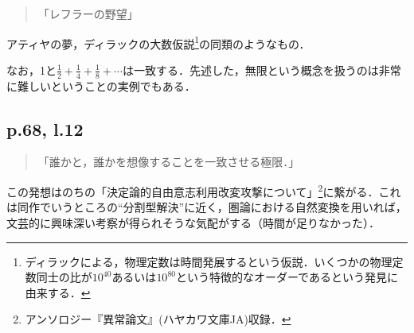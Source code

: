 \documentclass[10pt, a5paper, twoside]{jsarticle}
\theoremstyle{definition}
\begin{document}
                \begin{quote}

                    「レフラーの野望」

                \end{quote}

                アティヤの夢，ディラックの大数仮説\footnote{ディラックによる，物理定数は時間発展するという仮説．いくつかの物理定数同士の比が$10^{40}$あるいは$10^{80}$という特徴的なオーダーであるという発見に由来する．}の同類のようなもの．

                なお，1と$\displaystyle \frac{1}{2} + \frac{1}{4} + \frac{1}{8} + \cdots$は一致する．先述した，無限という概念を扱うのは非常に難しいということの実例でもある．

            \subsection{p.68, l.12}

                \begin{quote}

                    「誰かと，誰かを想像することを一致させる極限．」

                \end{quote}

                この発想はのちの「決定論的自由意志利用改変攻撃について」\footnote{アンソロジー『異常論文』(ハヤカワ文庫JA)収録．}に繋がる．これは同作でいうところの“分割型解決”に近く，圏論における自然変換を用いれば，文芸的に興味深い考察が得られそうな気配がする（時間が足りなかった）．
\end{document}
